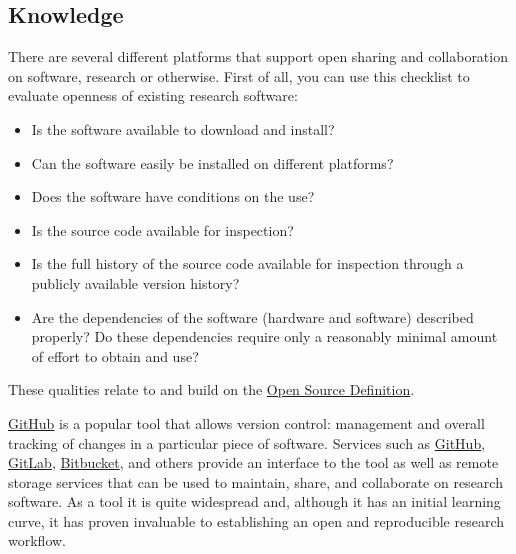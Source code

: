 \documentclass{article}
\begin{document}
\subsection{Knowledge}\label{knowledge}



There are several different platforms that support open sharing and collaboration on software, research or otherwise. First of all, you can use this checklist to evaluate openness of existing research software:

\begin{itemize}
\item Is the software available to download and install?


\item Can the software easily be installed on different platforms?


\item Does the software have conditions on the use?


\item Is the source code available for inspection?


\item Is the full history of the source code available for inspection through a publicly available version history?


\item Are the dependencies of the software (hardware and software) described properly? Do these dependencies require only a reasonably minimal amount of effort to obtain and use?


\end{itemize}

These qualities relate to and build on the \href{https://opensource.org/osd}{Open Source Definition}.


\href{https://book.fosteropenscience.eu/en/02OpenScienceBasics/www.github.com}{GitHub} is a popular tool that allows version control: management and overall tracking of changes in a particular piece of software. Services such as \href{https://book.fosteropenscience.eu/en/02OpenScienceBasics/www.github.com}{GitHub}, \href{https://about.gitlab.com/}{GitLab}, \href{https://bitbucket.org/}{Bitbucket}, and others provide an interface to the tool as well as remote storage services that can be used to maintain, share, and collaborate on research software. As a tool it is quite widespread and, although it has an initial learning curve, it has proven invaluable to establishing an open and reproducible research workflow.
\end{document}
